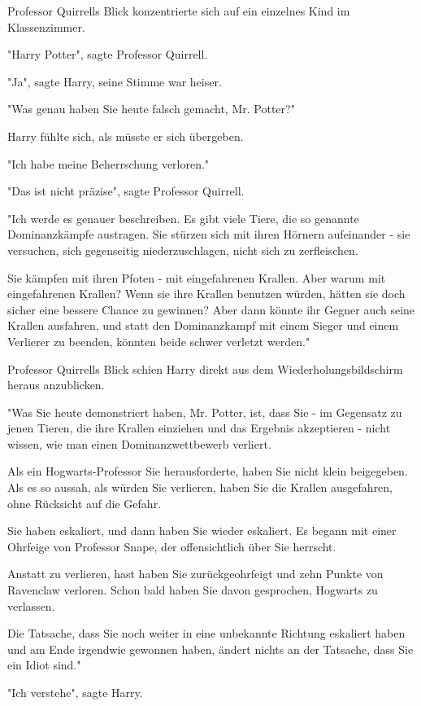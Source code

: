 {Professor Quirrells Blick konzentrierte sich auf ein einzelnes Kind im Klassenzimmer.

"Harry Potter", sagte Professor Quirrell.

"Ja", sagte Harry, seine Stimme war heiser.

"Was genau haben Sie heute falsch gemacht, Mr. Potter?"

Harry fühlte sich, als müsste er sich übergeben.

"Ich habe meine Beherrschung verloren."

"Das ist nicht präzise", sagte Professor Quirrell.

"Ich werde es genauer beschreiben. Es gibt viele Tiere, die so genannte Dominanzkämpfe austragen. Sie stürzen sich mit ihren Hörnern aufeinander - sie versuchen, sich gegenseitig niederzuschlagen, nicht sich zu zerfleischen.

Sie kämpfen mit ihren Pfoten - mit eingefahrenen Krallen. Aber warum mit eingefahrenen Krallen? Wenn sie ihre Krallen benutzen würden, hätten sie doch sicher eine bessere Chance zu gewinnen? Aber dann könnte ihr Gegner auch seine Krallen ausfahren, und statt den Dominanzkampf mit einem Sieger und einem Verlierer zu beenden, könnten beide schwer verletzt werden."

Professor Quirrells Blick schien Harry direkt aus dem Wiederholungsbildschirm heraus anzublicken.

"Was Sie heute demonstriert haben, Mr. Potter, ist, dass Sie - im Gegensatz zu jenen Tieren, die ihre Krallen einziehen und das Ergebnis akzeptieren - nicht wissen, wie man einen Dominanzwettbewerb verliert.

Als ein Hogwarts-Professor Sie herausforderte, haben Sie nicht klein beigegeben. Als es so aussah, als würden Sie verlieren, haben Sie die Krallen ausgefahren, ohne Rücksicht auf die Gefahr.

Sie haben eskaliert, und dann haben Sie wieder eskaliert. Es begann mit einer Ohrfeige von Professor Snape, der offensichtlich über Sie herrscht.

Anstatt zu verlieren, hast haben Sie zurückgeohrfeigt und zehn Punkte von Ravenclaw verloren. Schon bald haben Sie davon gesprochen, Hogwarts zu verlassen.

Die Tatsache, dass Sie noch weiter in eine unbekannte Richtung eskaliert haben und am Ende irgendwie gewonnen haben, ändert nichts an der Tatsache, dass Sie ein Idiot sind."

"Ich verstehe", sagte Harry.

}
